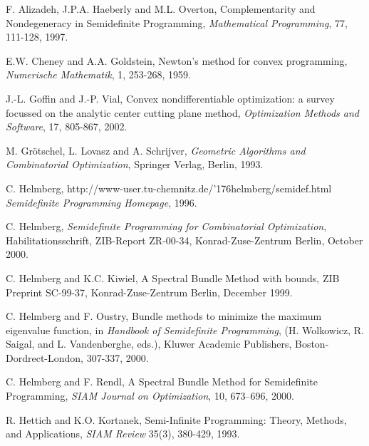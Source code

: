 \documentclass[12pt]{kluwer}
\newcommand{\til}{\char '176}
\begin{document}
\begin{article}
\begin{thebibliography}{55}

F. Alizadeh, J.P.A. Haeberly and M.L. Overton,
Complementarity and Nondegeneracy in Semidefinite Programming,
{\em Mathematical Programming}, 77, 111-128, 1997.

E.W. Cheney and A.A. Goldstein,
Newton's method for convex programming,
{\em Numerische Mathematik}, 1, 253-268, 1959.

J.-L. Goffin and J.-P. Vial,
Convex nondifferentiable optimization: a survey focussed on the
analytic center cutting plane method,
{\em Optimization Methods and Software}, 17, 805-867, 2002.

M. Gr\"otschel, L. Lovasz and A. Schrijver,
{\em Geometric Algorithms and Combinatorial Optimization},
Springer Verlag, Berlin, 1993.

C. Helmberg,
http://www-user.tu-chemnitz.de/\til helmberg/semidef.html
{\em Semidefinite Programming Homepage}, 1996.

 C. Helmberg,
{\em Semidefinite Programming for Combinatorial Optimization},
Habilitationsschrift,
ZIB-Report ZR-00-34, Konrad-Zuse-Zentrum Berlin,
October 2000.

C. Helmberg and K.C. Kiwiel,
A Spectral Bundle Method with bounds,
ZIB Preprint SC-99-37, Konrad-Zuse-Zentrum Berlin,
December 1999.

C. Helmberg and F. Oustry,
Bundle methods to minimize the maximum eigenvalue function,
in
{\em Handbook of Semidefinite Programming},
(H. Wolkowicz, R. Saigal, and L. Vandenberghe, eds.),
Kluwer Academic Publishers, Boston-Dordrect-London, 307-337, 2000.

C. Helmberg and F. Rendl,
A Spectral Bundle Method for Semidefinite Programming,
{\em SIAM Journal on Optimization}, 10, 673--696, 2000.

R. Hettich and K.O. Kortanek,
Semi-Infinite Programming: Theory, Methods, and Applications,
{\em SIAM Review} 35(3), 380-429, 1993.


\end{thebibliography}
\end{article}
\end{document}
